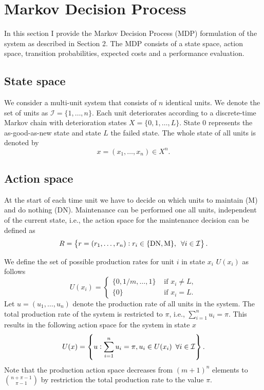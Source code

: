 \documentclass[a4paper,12pt]{article}
\begin{document}
\section{Markov Decision Process}
In this section I provide the Markov Decision Process (MDP) formulation of the system as described in Section 2. The MDP consists of a state space, action space, transition probabilities, expected costs and a performance evaluation.

\subsection{State space}
We consider a multi-unit system that consists of $n$ identical units. We denote the set of units as $\mathcal{I} = \{1, \dots, n\}$. Each unit deteriorates according to a discrete-time Markov chain with deterioration states $X = \{0, 1, \dots, L\}$. State $0$ represents the as-good-as-new state and state $L$ the failed state. The whole state of all units is denoted by
$$
x = (x_1, \dots, x_n) \in X^n.
$$

\subsection{Action space}
At the start of each time unit we have to decide on which units to maintain (M) and do nothing (DN). Maintenance can be performed one all units, independent of the current state, i.e., the action space for the maintenance decision can be defined as
$$
R = \left \{r = (r_1, \dots, r_n): r_i \in \{\text{DN}, \text{M}\}, \enskip \forall i \in \mathcal{I} \right \}.
$$

 We define the set of possible production rates for unit $i$ in state $x_i$ $U(x_i)$ as follows
$$
U(x_i) = \begin{cases}
\{0, 1/m, \dots, 1\} & \text{ if } x_i \neq L, \\
\{0\} & \text{ if } x_i = L.
\end{cases}
$$
Let $u = (u_1, \dots, u_n)$ denote the production rate of all units in the system. The total production rate of the system is restricted to $\pi$, i.e., $ \sum_{i=1}^{n}u_i = \pi$. This results in the following action space for the system in state $x$
$$
U(x) = \left\{ u  :  \sum_{i=1}^{n}u_i = \pi, u_i \in U(x_i) \enskip \forall i \in \mathcal{I} \right\}.
$$
Note that the production action space decreases from $(m+1)^n$ elements to ${n + \pi - 1} \choose{\pi - 1} $ by restriction the total production rate to the value $\pi$. 
\end{document}
